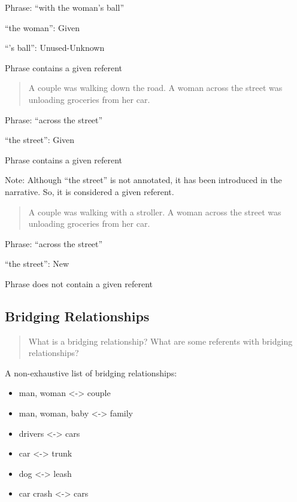 \documentclass[
]{book}
\providecommand{\tightlist}{%
  \setlength{\itemsep}{0pt}\setlength{\parskip}{0pt}}
\begin{document}
Phrase: ``with the woman's ball''

``the woman'': Given

``'s ball'': Unused-Unknown

Phrase contains a given referent

\begin{quote}
A couple was walking down the road.
A woman across the street was unloading groceries from her car.
\end{quote}

Phrase: ``across the street''

``the street'': Given

Phrase contains a given referent

Note: Although ``the street'' is not annotated, it has been introduced in the narrative.
So, it is considered a given referent.

\begin{quote}
A couple was walking with a stroller.
A woman across the street was unloading groceries from her car.
\end{quote}

Phrase: ``across the street''

``the street'': New

Phrase does not contain a given referent

\hypertarget{bridging-relationships}{%
\subsection{Bridging Relationships}\label{bridging-relationships}}

\begin{quote}
What is a bridging relationship?
What are some referents with bridging relationships?
\end{quote}

A non-exhaustive list of bridging relationships:

\begin{itemize}
\tightlist
\item
  man, woman \textless-\textgreater{} couple
\item
  man, woman, baby \textless-\textgreater{} family
\item
  drivers \textless-\textgreater{} cars
\item
  car \textless-\textgreater{} trunk
\item
  dog \textless-\textgreater{} leash
\item
  car crash \textless-\textgreater{} cars
\end{itemize}
\end{document}
